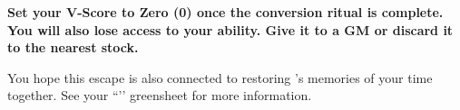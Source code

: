 \documentclass[green]{GL2020}
\begin{document}
\textbf{Set your V-Score to Zero (0) once the conversion ritual is complete. You will also lose access to your \aLuck{} ability. Give it to a GM or discard it to the nearest stock.}

You hope this escape is also connected to restoring \cHeadScientist{}’s memories of your time together. See your ``\gRestoringLove{}’’ greensheet for more information.
\end{document}

